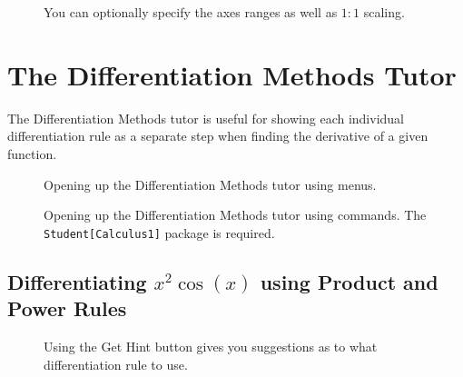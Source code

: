 \begin{figure}[h]
\caption{You can optionally specify the axes ranges as well as $1:1$ scaling.}
\centering
{}
\end{figure}

\section{The Differentiation Methods Tutor}
\label{sec:the_differentiation_methods_tutor}

The Differentiation Methods tutor is useful for showing each individual differentiation rule as a separate step when finding the derivative of a given function.

\begin{figure}[h]
\caption{Opening up the Differentiation Methods tutor using menus.}
\centering
{}
\end{figure}

\begin{figure}[h]
\caption{Opening up the Differentiation Methods tutor using commands. The \texttt{Student[Calculus1]} package is required.}
\centering
{}
\end{figure}

\clearpage

\subsection{Differentiating $x^2\cos(x)$ using Product and Power Rules}

\begin{figure}[h]
\caption{Using the Get Hint button gives you suggestions as to what differentiation rule to use.}
\centering
{}
\end{figure}


